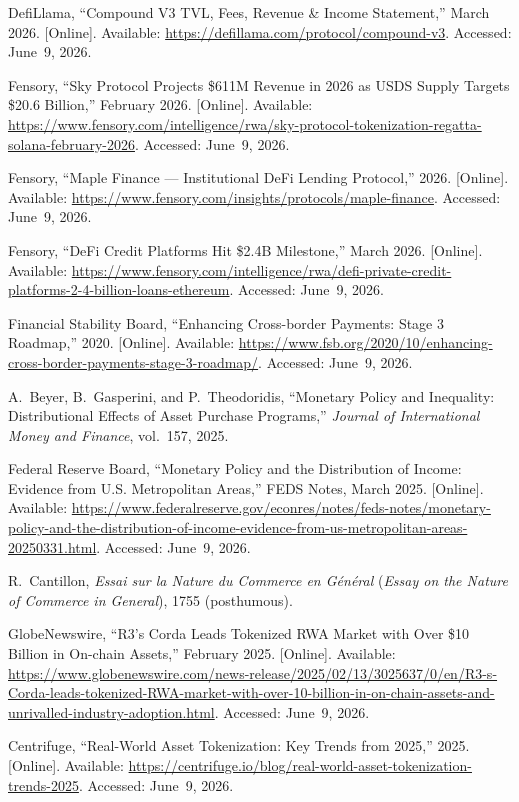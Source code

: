 \documentclass[12pt,a4paper]{report}
\begin{document}
{\begin{enumerate}[label={[\arabic*]}]
\item DefiLlama, ``Compound V3 TVL, Fees, Revenue \& Income Statement,'' March 2026. [Online]. Available: \url{https://defillama.com/protocol/compound-v3}. Accessed: June~9, 2026.

\item Fensory, ``Sky Protocol Projects \$611M Revenue in 2026 as USDS Supply Targets \$20.6 Billion,'' February 2026. [Online]. Available: \url{https://www.fensory.com/intelligence/rwa/sky-protocol-tokenization-regatta-solana-february-2026}. Accessed: June~9, 2026.

\item Fensory, ``Maple Finance --- Institutional DeFi Lending Protocol,'' 2026. [Online]. Available: \url{https://www.fensory.com/insights/protocols/maple-finance}. Accessed: June~9, 2026.

\item Fensory, ``DeFi Credit Platforms Hit \$2.4B Milestone,'' March 2026. [Online]. Available: \url{https://www.fensory.com/intelligence/rwa/defi-private-credit-platforms-2-4-billion-loans-ethereum}. Accessed: June~9, 2026.

\item Financial Stability Board, ``Enhancing Cross-border Payments: Stage 3 Roadmap,'' 2020. [Online]. Available: \url{https://www.fsb.org/2020/10/enhancing-cross-border-payments-stage-3-roadmap/}. Accessed: June~9, 2026.

\item A.~Beyer, B.~Gasperini, and P.~Theodoridis, ``Monetary Policy and Inequality: Distributional Effects of Asset Purchase Programs,'' \textit{Journal of International Money and Finance}, vol.~157, 2025.

\item Federal Reserve Board, ``Monetary Policy and the Distribution of Income: Evidence from U.S. Metropolitan Areas,'' FEDS Notes, March 2025. [Online]. Available: \url{https://www.federalreserve.gov/econres/notes/feds-notes/monetary-policy-and-the-distribution-of-income-evidence-from-us-metropolitan-areas-20250331.html}. Accessed: June~9, 2026.

\item R.~Cantillon, \textit{Essai sur la Nature du Commerce en G\'en\'eral} (\textit{Essay on the Nature of Commerce in General}), 1755 (posthumous).

\item GlobeNewswire, ``R3's Corda Leads Tokenized RWA Market with Over \$10 Billion in On-chain Assets,'' February 2025. [Online]. Available: \url{https://www.globenewswire.com/news-release/2025/02/13/3025637/0/en/R3-s-Corda-leads-tokenized-RWA-market-with-over-10-billion-in-on-chain-assets-and-unrivalled-industry-adoption.html}. Accessed: June~9, 2026.
\item Centrifuge, ``Real-World Asset Tokenization: Key Trends from 2025,'' 2025. [Online]. Available: \url{https://centrifuge.io/blog/real-world-asset-tokenization-trends-2025}. Accessed: June~9, 2026.


\end{enumerate}}
\end{document}
